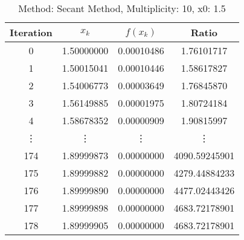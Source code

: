 \begin{table}
\centering
\caption{Method: Secant Method, Multiplicity: 10, x0: 1.5}
\label{tab:table_Secant_Method_10_1_5}
\begin{tabular}{c c c c}
\toprule
Iteration &      $x_k$ &   $f(x_k)$ &         Ratio \\
\midrule
        0 & 1.50000000 & 0.00010486 &    1.76101717 \\
        1 & 1.50015041 & 0.00010446 &    1.58617827 \\
        2 & 1.54006773 & 0.00003649 &    1.76845870 \\
        3 & 1.56149885 & 0.00001975 &    1.80724184 \\
        4 & 1.58678352 & 0.00000909 &    1.90815997 \\
   \vdots &     \vdots &     \vdots &        \vdots \\
      174 & 1.89999873 & 0.00000000 & 4090.59245901 \\
      175 & 1.89999882 & 0.00000000 & 4279.44884233 \\
      176 & 1.89999890 & 0.00000000 & 4477.02443426 \\
      177 & 1.89999898 & 0.00000000 & 4683.72178901 \\
      178 & 1.89999905 & 0.00000000 & 4683.72178901 \\
\bottomrule
\end{tabular}
\end{table}
